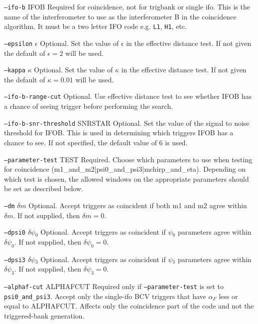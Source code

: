\begin{entry}
\begin{entry}
\item[\texttt{--ifo-b} \textsc{IFOB}] Required for coincidence, not for
trigbank or single ifo. This is the name of the interferometer to use as
the interferometer B in the coincidence algorithm.  It must be a two
letter IFO code e.g. \texttt{L1}, \texttt{H1}, etc.

\item[\texttt{--epsilon} \textsc{$\epsilon$}] Optional. Set the value of
$\epsilon$ in the effective distance test. If not given the default of
$\epsilon = 2$ will be used.

\item[\texttt{--kappa} \textsc{$\kappa$}] Optional. Set the value of
$\kappa$ in the effective distance test. If not given the default of
$\kappa= 0.01$ will be used.

\item[\texttt{--ifo-b-range-cut}] Optional.  Use effective distance test
to see whether \textsc{IFOB} has a chance of seeing trigger before
performing the search.

\item[\texttt{--ifo-b-snr-threshold} \textsc{SNRSTAR}] Optional.  Set the 
value of the signal to noise threshold for \textsc{IFOB}.  This is used in
determining which triggers \textsc{IFOB} has a chance to see.  If not
specified, the default value of 6 is used.

\item[\texttt{--parameter-test} TEST] Required. Choose which parameters
to use when testing for coincidence
(m1\_and\_m2|psi0\_and\_psi3|mchirp\_and\_eta).  Depending on which test
is chosen, the allowed windows on the appropriate parameters should be
set as described below.

\item[\texttt{--dm} \textsc{$\delta m$}] Optional. Accept triggers as
coincident if both m1 and m2 agree within $\delta m$.  If not supplied,
	   then $\delta m = 0$.

\item[\texttt{--dpsi0} \textsc{$\delta \psi_0$}] Optional. Accept
triggers as coincident if \textsc{$\psi_0$} parameters agree within
$\delta \psi_0$.  If not supplied,  then $\delta  \psi_0 = 0$.

\item[\texttt{--dpsi3} \textsc{$\delta \psi_3$}] Optional. Accept
triggers as coincident if \textsc{$\psi_3$} parameters agree within
$\delta \psi_3$.  If not supplied,  then $\delta  \psi_3 = 0$.

\item[\texttt{--alphaf-cut} \textsc{ALPHAFCUT}] Required only if
\texttt{--parameter-test} is set to \texttt{psi0\_and\_psi3}. Accept 
only the single-ifo BCV triggers that have $\alpha_F$ less or
equal to \textsc{ALPHAFCUT}. Affects only the coincidence part of
the code and not the triggered-bank generation.


\end{entry}
\end{entry}
